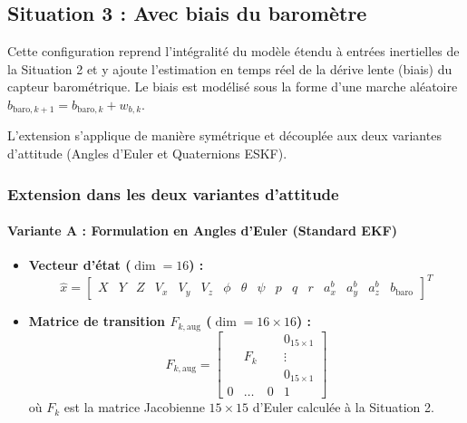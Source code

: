 \documentclass[../Formulations_Kalman.tex]{subfiles}
\begin{document}
\subsection{Situation 3 : Avec biais du baromètre}
Cette configuration reprend l'intégralité du modèle étendu à entrées inertielles de la Situation 2 et y ajoute l'estimation en temps réel de la dérive lente (biais) du capteur barométrique. Le biais est modélisé sous la forme d'une marche aléatoire $b_{\text{baro}, k+1} = b_{\text{baro}, k} + w_{b, k}$.

L'extension s'applique de manière symétrique et découplée aux deux variantes d'attitude (Angles d'Euler et Quaternions ESKF).

\subsubsection{Extension dans les deux variantes d'attitude}

\paragraph{Variante A : Formulation en Angles d'Euler (Standard EKF)}
\begin{itemize}
    \item \textbf{Vecteur d'état ($\dim = 16$) :}
    \begin{equation}
    \hat{x} = \begin{bmatrix} X & Y & Z & V_x & V_y & V_z & \phi & \theta & \psi & p & q & r & a_x^b & a_y^b & a_z^b & b_{\text{baro}} \end{bmatrix}^T
    \end{equation}
    \item \textbf{Matrice de transition $F_{k,\text{aug}}$ ($\dim = 16 \times 16$) :}
    \begin{equation}
    F_{k,\text{aug}} = \begin{bmatrix}
    & & & 0_{15\times1} \\
    & F_k & & \vdots \\
    & & & 0_{15\times1} \\
    0 & \dots & 0 & 1
    \end{bmatrix}
    \end{equation}
    où $F_k$ est la matrice Jacobienne $15 \times 15$ d'Euler calculée à la Situation 2.
\end{itemize}
\end{document}
